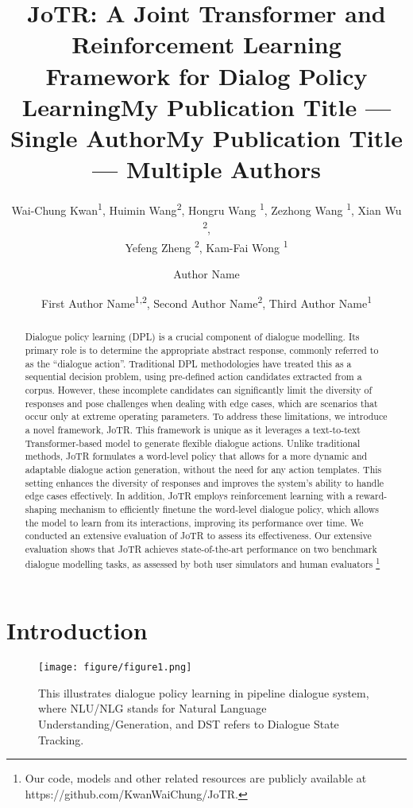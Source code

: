 \documentclass[letterpaper]{article} %
\title{JoTR: A Joint Transformer and Reinforcement Learning Framework for Dialog Policy Learning}
\author{
    Wai-Chung Kwan\equalcontrib \textsuperscript{\rm 1},
    Huimin Wang\equalcontrib \textsuperscript{\rm 2},
    Hongru Wang \textsuperscript{\rm 1},
    Zezhong Wang \textsuperscript{\rm 1},
    Xian Wu \textsuperscript{\rm 2}, \\
    Yefeng Zheng \textsuperscript{\rm 2},
    Kam-Fai Wong \textsuperscript{\rm 1}
}
\title{My Publication Title --- Single Author}
\author {
    Author Name
}
\title{My Publication Title --- Multiple Authors}
\author {
    First Author Name\textsuperscript{\rm 1,\rm 2},
    Second Author Name\textsuperscript{\rm 2},
    Third Author Name\textsuperscript{\rm 1}
}
\begin{document}
\maketitle

\begin{abstract}
Dialogue policy learning (DPL) is a crucial component of dialogue modelling. Its primary role is to determine the appropriate abstract response, commonly referred to as the “dialogue action”. Traditional DPL methodologies have treated this as a sequential decision problem, using pre-defined action candidates extracted from a corpus. However, these incomplete candidates can significantly limit the diversity of responses and pose challenges when dealing with edge cases, which are scenarios that occur only at extreme operating parameters. To address these limitations, we introduce a novel framework, JoTR. This framework is unique as it leverages a text-to-text Transformer-based model to generate flexible dialogue actions. Unlike traditional methods, JoTR formulates a word-level policy that allows for a more dynamic and adaptable dialogue action generation, without the need for any action templates. This setting enhances the diversity of responses and improves the system's ability to handle edge cases effectively. In addition, JoTR employs reinforcement learning with a reward-shaping mechanism to efficiently finetune the word-level dialogue policy, which allows the model to learn from its interactions, improving its performance over time. We conducted an extensive evaluation of JoTR to assess its effectiveness. Our extensive evaluation shows that JoTR achieves state-of-the-art performance on two benchmark dialogue modelling tasks, as assessed by both user simulators and human evaluators \footnote{Our code, models and other related resources are publicly available at https://github.com/KwanWaiChung/JoTR.}
\end{abstract}

\section{Introduction}
\begin{figure}
    \centering
    \texttt{[image: figure/figure1.png]}
    \caption{This illustrates dialogue policy learning in pipeline dialogue system, where NLU/NLG stands for Natural Language Understanding/Generation, and DST refers to Dialogue State Tracking.}
    \label{fig1:intro}
    \vspace{-2mm}
\end{figure}
\end{document}
